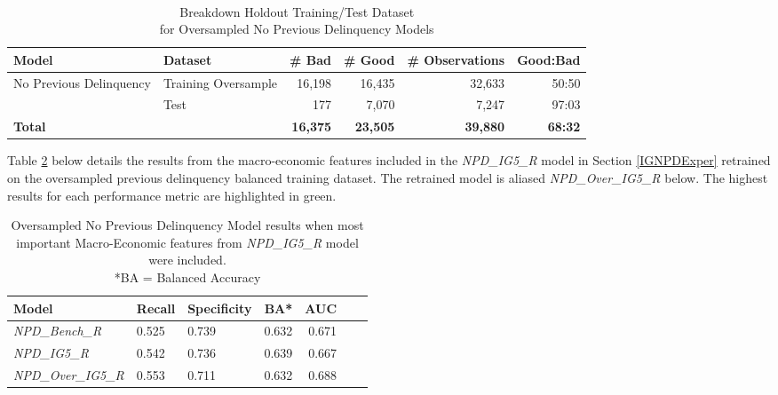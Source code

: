 \begin{table}[H]
	\centering\
	\resizebox{\textwidth}{!}
	{
		\begin{tabular}{l l r r r r}
			\hline
			\textbf{Model} &  \textbf{Dataset} & \textbf{\# Bad} & \textbf{\# Good} & \textbf{\# Observations} & \textbf{Good:Bad} \\
			\hline
			No Previous Delinquency & Training Oversample & 16,198 & 16,435 & 32,633 & 50:50 \\ 
			& Test & 177 & 7,070 & 7,247 & 97:03 	\\\hline
			\textbf{Total}     &  & \textbf{16,375} & \textbf{23,505} & \textbf{39,880} & \textbf{68:32} \\
			\hline
		\end{tabular}
	}
	\caption{Breakdown Holdout Training/Test Dataset \\for Oversampled No Previous Delinquency Models}
	\label{table:oversample_train_testNPD}
\end{table}

Table \ref{table:overNPD} below details the results from the macro-economic features included in the \textit{NPD\_IG5\_R} model in Section \ref{IGNPDExper} retrained on the oversampled previous delinquency balanced training dataset. The retrained model is aliased \textit{NPD\_Over\_IG5\_R} below. The highest results for each performance metric are highlighted in green.

\begin{table}[H]
	\centering
	\small
	\begin{tabular}{l l l r r r r}
		\hline
\textbf{Model} & \textbf{Recall} & \textbf{Specificity} & \textbf{BA*} & \textbf{AUC}  \\ \hline
\textit{NPD\_Bench\_R} & 0.525 & \cellcolor{green!25}0.739 & 0.632 & 0.671   \\ \hline
\textit{NPD\_IG5\_R} & 0.542 & 0.736 & \cellcolor{green!25}0.639 & 0.667   \\ 
\textit{NPD\_Over\_IG5\_R} &  \cellcolor{green!25}0.553 & 0.711 & 0.632 & \cellcolor{green!25}0.688   \\ \hline
	\end{tabular}
	\caption{{Oversampled No Previous Delinquency Model results when most \\important
			Macro-Economic features from \textit{NPD\_IG5\_R} model were included.
			\\ *BA = Balanced Accuracy}}
	\label{table:overNPD}
\end{table}

